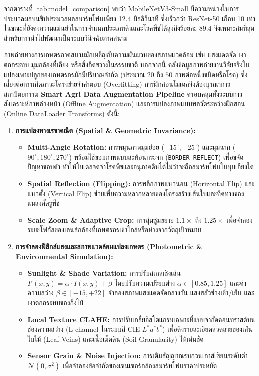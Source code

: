 จากตารางที่ \ref{tab:model_comparison} พบว่า MobileNetV3-Small มีความหน่วงในการประมวลผลบนชิปประมวลผลสมาร์ทโฟนเพียง 12.4 มิลลิวินาที ซึ่งเร็วกว่า ResNet-50 เกือบ 10 เท่า ในขณะที่ยังคงความแม่นยำในการจำแนกประเภทดินและโรคพืชได้สูงถึงร้อยละ 89.4 จึงเหมาะสมที่สุดสำหรับการนำไปพัฒนาเป็นระบบวินิจฉัยภาคสนาม

\label{sec:data_pipeline}

ภาพถ่ายทางการเกษตรภาคสนามมักเผชิญกับความผันผวนของสภาพแวดล้อม เช่น แสงแดดจัด เงาตกกระทบ มุมกล้องที่เอียง หรือสิ่งกีดขวางในธรรมชาติ นอกจากนี้ คลังข้อมูลภาพถ่ายงานวิจัยจริงในแปลงเพาะปลูกของเกษตรกรมักมีปริมาณจำกัด (ประมาณ $20$ ถึง $50$ ภาพต่อหนึ่งชนิดหรือโรค) ซึ่งเสี่ยงต่อการเกิดภาวะโครงข่ายจำคำตอบ (Overfitting) การฝึกสอนโมเดลจึงต้องบูรณาการสถาปัตยกรรม \textbf{Smart Agri Data Augmentation Pipeline} ครอบคลุมทั้งระบบการสังเคราะห์ภาพล่วงหน้า (Offline Augmentation) และการแปลงภาพแบบพลวัตระหว่างฝึกสอน (Online DataLoader Transforms) ดังนี้:

\begin{enumerate}
    \item \textbf{การแปลงทางเรขาคณิต (Spatial \& Geometric Invariance):}
    \begin{itemize}
        \item \textbf{Multi-Angle Rotation:} การหมุนภาพมุมย่อย ($\pm 15^\circ, \pm 25^\circ$) และมุมฉาก ($90^\circ, 180^\circ, 270^\circ$) พร้อมใช้ขอบภาพแบบสะท้อนกระจก (\texttt{BORDER\_REFLECT}) เพื่อขจัดปัญหาขอบดำ ทำให้โมเดลจดจำโรคพืชและอนุภาคดินได้ไม่ว่าจะถือสมาร์ทโฟนในมุมเอียงใด
        \item \textbf{Spatial Reflection (Flipping):} การพลิกภาพแนวนอน (Horizontal Flip) และแนวตั้ง (Vertical Flip) ช่วยเพิ่มความหลากหลายของโครงสร้างเส้นใบและทิศทางของแมลงศัตรูพืช
        \item \textbf{Scale Zoom \& Adaptive Crop:} การสุ่มซูมขยาย $1.1\times$ ถึง $1.25\times$ เพื่อจำลองระยะโฟกัสของเลนส์กล้องที่เกษตรกรเข้าใกล้หรือห่างจากวัตถุเป้าหมาย
    \end{itemize}
    \item \textbf{การจำลองฟิสิกส์แสงและสภาพแวดล้อมแปลงเกษตร (Photometric \& Environmental Simulation):}
    \begin{itemize}
        \item \textbf{Sunlight \& Shade Variation:} การปรับสเกลเชิงเส้น $I'(x, y) = \alpha \cdot I(x, y) + \beta$ โดยปรับความเปรียบต่าง $\alpha \in [0.85, 1.25]$ และค่าความสว่าง $\beta \in [-15, +22]$ จำลองสภาพแสงแดดจัดกลางวัน แสงสลัวช่วงเช้า/เย็น และเงาตกกระทบของกิ่งไม้
        \item \textbf{Local Texture CLAHE:} การปรับเกลี่ยฮิสโตแกรมเฉพาะที่แบบจำกัดคอนทราสต์บนช่องความสว่าง (L-channel ในระบบสี CIE $L^*a^*b^*$) เพื่อดึงรายละเอียดลวดลายของเส้นใบไม้ (Leaf Veins) และเนื้อเม็ดดิน (Soil Granularity) ให้เด่นชัด
        \item \textbf{Sensor Grain \& Noise Injection:} การเติมสัญญาณรบกวนเกาส์เซียนระดับต่ำ $\mathcal{N}(0, \sigma^2)$ เพื่อจำลองข้อจำกัดของเซนเซอร์กล้องสมาร์ทโฟนราคาประหยัด
    \end{itemize}
\end{enumerate}

